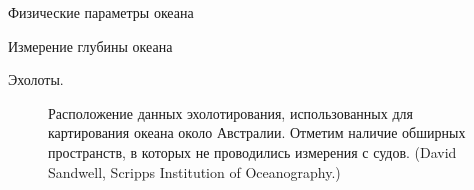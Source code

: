 \begin{chapter}{Физические параметры океана}
\begin{section}{Измерение глубины океана}
\begin{paragraph}{Эхолоты.}
\begin{figure}[t!]
\caption{Расположение данных эхолотирования, использованных для картирования 
океана около Австралии. Отметим наличие обширных пространств, в которых 
не проводились измерения с судов. 
(David Sandwell, Scripps Institution of Oceanography.)}
\label{fig:shiptracks10}
\end{figure}
%
% 



\end{paragraph}
\end{section}
\end{chapter}
